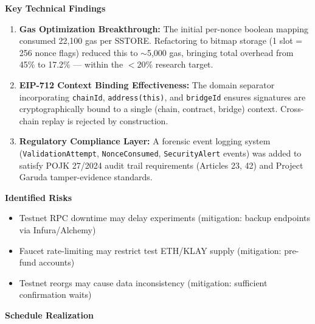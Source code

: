 \documentclass[
]{article}
\begin{document}
\textbf{Key Technical Findings}

\begin{enumerate}
  \item \textbf{Gas Optimization Breakthrough:} The initial per-nonce boolean mapping consumed 22,100 gas per SSTORE. Refactoring to bitmap storage (1 slot = 256 nonce flags) reduced this to $\sim$5,000 gas, bringing total overhead from 45\% to 17.2\% --- within the $<$20\% research target.
  \item \textbf{EIP-712 Context Binding Effectiveness:} The domain separator incorporating \texttt{chainId}, \texttt{address(this)}, and \texttt{bridgeId} ensures signatures are cryptographically bound to a single (chain, contract, bridge) context. Cross-chain replay is rejected by construction.
  \item \textbf{Regulatory Compliance Layer:} A forensic event logging system (\texttt{ValidationAttempt}, \texttt{NonceConsumed}, \texttt{SecurityAlert} events) was added to satisfy POJK 27/2024 audit trail requirements (Articles 23, 42) and Project Garuda tamper-evidence standards.
\end{enumerate}

\textbf{Identified Risks}

\begin{itemize}
  \item Testnet RPC downtime may delay experiments (mitigation: backup endpoints via Infura/Alchemy)
  \item Faucet rate-limiting may restrict test ETH/KLAY supply (mitigation: pre-fund accounts)
  \item Testnet reorgs may cause data inconsistency (mitigation: sufficient confirmation waits)
\end{itemize}

\textbf{Schedule Realization}
\end{document}
